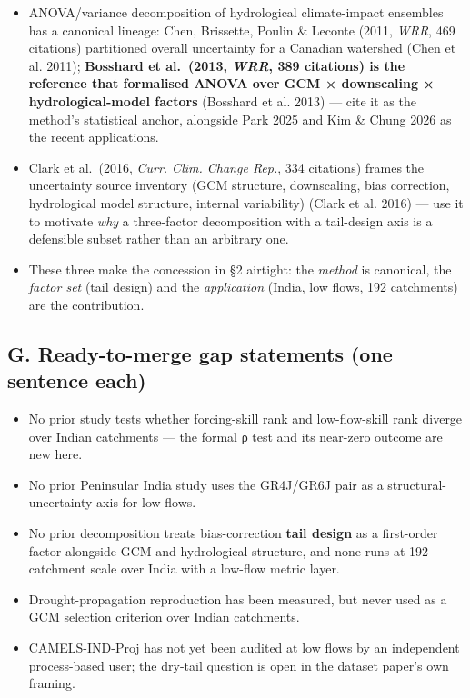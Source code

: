 \documentclass[
  11pt,
]{article}
\providecommand{\tightlist}{%
  \setlength{\itemsep}{0pt}\setlength{\parskip}{0pt}}
\begin{document}
\begin{itemize}
\tightlist
\item
  ANOVA/variance decomposition of hydrological climate-impact ensembles
  has a canonical lineage: Chen, Brissette, Poulin \& Leconte (2011,
  \emph{WRR}, 469 citations) partitioned overall uncertainty for a
  Canadian watershed (Chen et al. 2011); \textbf{Bosshard et al.~(2013,
  \emph{WRR}, 389 citations) is the reference that formalised ANOVA over
  GCM × downscaling × hydrological-model factors} (Bosshard et al. 2013)
  --- cite it as the method's statistical anchor, alongside Park 2025
  and Kim \& Chung 2026 as the recent applications.
\item
  Clark et al.~(2016, \emph{Curr. Clim. Change Rep.}, 334 citations)
  frames the uncertainty source inventory (GCM structure, downscaling,
  bias correction, hydrological model structure, internal variability)
  ({Clark et al.} 2016) --- use it to motivate \emph{why} a three-factor
  decomposition with a tail-design axis is a defensible subset rather
  than an arbitrary one.
\item
  These three make the concession in §2 airtight: the \emph{method} is
  canonical, the \emph{factor set} (tail design) and the
  \emph{application} (India, low flows, 192 catchments) are the
  contribution.
\end{itemize}

\subsection{G. Ready-to-merge gap statements (one sentence
each)}\label{g.-ready-to-merge-gap-statements-one-sentence-each}

\begin{itemize}
\tightlist
\item
  No prior study tests whether forcing-skill rank and low-flow-skill
  rank diverge over Indian catchments --- the formal ρ test and its
  near-zero outcome are new here.
\item
  No prior Peninsular India study uses the GR4J/GR6J pair as a
  structural-uncertainty axis for low flows.
\item
  No prior decomposition treats bias-correction \textbf{tail design} as
  a first-order factor alongside GCM and hydrological structure, and
  none runs at 192-catchment scale over India with a low-flow metric
  layer.
\item
  Drought-propagation reproduction has been measured, but never used as
  a GCM selection criterion over Indian catchments.
\item
  CAMELS-IND-Proj has not yet been audited at low flows by an
  independent process-based user; the dry-tail question is open in the
  dataset paper's own framing.
\end{itemize}
\end{document}

